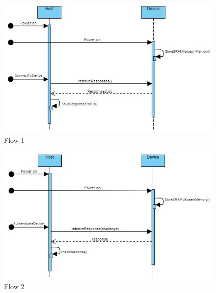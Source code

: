 \begin{figure}[H]
\centering
  \includegraphics{images/Flow1.jpg}
  \caption{Flow 1}
  \label{fig:Flow1}
\end{figure}

\begin{figure}[H]
\centering
  \includegraphics{images/Flow2.jpg}
  \caption{Flow 2}
  \label{fig:Flow2}
\end{figure}



